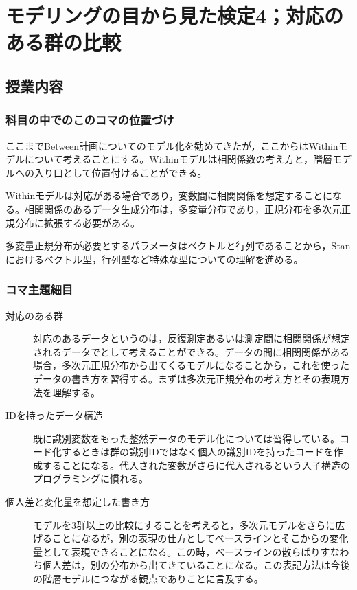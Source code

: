 \section{モデリングの目から見た検定4；対応のある群の比較}
\subsection{授業内容}
\subsubsection{科目の中でのこのコマの位置づけ}
ここまでBetween計画についてのモデル化を勧めてきたが，ここからはWithinモデルについて考えることにする。Withinモデルは相関係数の考え方と，階層モデルへの入り口として位置付けることができる。

Withinモデルは対応がある場合であり，変数間に相関関係を想定することになる。相関関係のあるデータ生成分布は，多変量分布であり，正規分布を多次元正規分布に拡張する必要がある。

多変量正規分布が必要とするパラメータはベクトルと行列であることから，Stanにおけるベクトル型，行列型など特殊な型についての理解を進める。

\subsubsection{コマ主題細目}
\begin{description}

	\item[対応のある群] 対応のあるデータというのは，反復測定あるいは測定間に相関関係が想定されるデータでとして考えることができる。データの間に相関関係がある場合，多次元正規分布から出てくるモデルになることから，これを使ったデータの書き方を習得する。まずは多次元正規分布の考え方とその表現方法を理解する。

	\item[IDを持ったデータ構造] 既に識別変数をもった整然データのモデル化については習得している。コード化するときは群の識別IDではなく個人の識別IDを持ったコードを作成することになる。代入された変数がさらに代入されるという入子構造のプログラミングに慣れる。

	\item[個人差と変化量を想定した書き方] モデルを3群以上の比較にすることを考えると，多次元モデルをさらに広げることになるが，別の表現の仕方としてベースラインとそこからの変化量として表現できることになる。この時，ベースラインの散らばりすなわち個人差は，別の分布から出てきていることになる。この表記方法は今後の階層モデルにつながる観点でありことに言及する。

\end{description}
